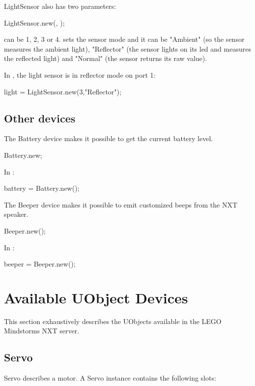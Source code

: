 LightSensor also has two parameters:
\begin{urbiunchecked}
LightSensor.new(, );
\end{urbiunchecked}

 can be 1, 2, 3 or 4.  sets the sensor mode and it can
be "Ambient" (so the sensor measures the ambient light), "Reflector" (the
sensor lights on its led and measures the reflected light) and "Normal" (the
sensor returns its raw value).

In , the light sensor is in reflector mode on port 1:
\begin{urbiunchecked}
light = LightSensor.new(3,"Reflector");
\end{urbiunchecked}


\subsection{Other devices}
The Battery device makes it possible to get the current battery level.
\begin{urbiunchecked}
Battery.new;
\end{urbiunchecked}

In :
\begin{urbiunchecked}
battery = Battery.new();
\end{urbiunchecked}

The Beeper device makes it possible to emit customized beeps from the NXT
speaker.
\begin{urbiunchecked}
Beeper.new();
\end{urbiunchecked}

In :
\begin{urbiunchecked}
beeper = Beeper.new();
\end{urbiunchecked}


\section{Available UObject Devices}
\label{sec:nxt:specs}
This section exhaustively describes the UObjects available in the LEGO
Mindstorms NXT \urbi server.

\subsection{Servo}
Servo describes a motor. A Servo instance contains the following slots:

